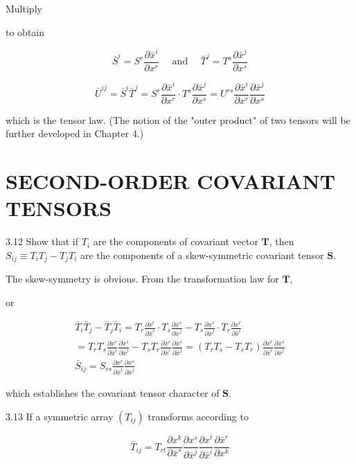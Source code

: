\documentclass[10pt]{article}
\begin{document}
Multiply

to obtain

$$
\bar{S}^{i}=S^{r} \frac{\partial \bar{x}^{i}}{\partial x^{r}} \quad \text { and } \quad \bar{T}^{j}=T^{s} \frac{\partial \bar{x}^{j}}{\partial x^{s}}
$$

$$
\bar{U}^{i j}=\bar{S}^{i} \bar{T}^{j}=S^{r} \frac{\partial \bar{x}^{i}}{\partial x^{r}} \cdot T^{s} \frac{\partial \bar{x}^{j}}{\partial x^{s}}=U^{r s} \frac{\partial \bar{x}^{i}}{\partial x^{r}} \frac{\partial \bar{x}^{j}}{\partial x^{s}}
$$

which is the tensor law. (The notion of the "outer product" of two tensors will be further developed in Chapter 4.)

\section*{SECOND-ORDER COVARIANT TENSORS}
3.12 Show that if $T_{i}$ are the components of covariant vector $\mathbf{T}$, then $S_{i j} \equiv T_{i} T_{j}-T_{j} T_{i}$ are the components of a skew-symmetric covariant tensor $\mathbf{S}$.

The skew-symmetry is obvious. From the transformation law for $\mathbf{T}$,

or

$$
\begin{gathered}
\bar{T}_{i} \bar{T}_{j}-\bar{T}_{j} \bar{T}_{i}=T_{r} \frac{\partial x^{r}}{\partial \bar{x}^{i}} \cdot T_{s} \frac{\partial x^{s}}{\partial \bar{x}^{j}}-T_{s} \frac{\partial x^{s}}{\partial \bar{x}^{j}} \cdot T_{r} \frac{\partial x^{r}}{\partial \bar{x}^{i}} \\
=T_{r} T_{s} \frac{\partial x^{r}}{\partial \bar{x}^{i}} \frac{\partial x^{s}}{\partial \bar{x}^{j}}-T_{s} T_{r} \frac{\partial x^{r}}{\partial \bar{x}^{i}} \frac{\partial x^{s}}{\partial \bar{x}^{j}}=\left(T_{r} T_{s}-T_{s} T_{r}\right) \frac{\partial x^{r}}{\partial \bar{x}^{i}} \frac{\partial x^{s}}{\partial \bar{x}^{j}} \\
\bar{S}_{i j}=S_{r s} \frac{\partial x^{r}}{\partial \bar{x}^{i}} \frac{\partial x^{s}}{\partial \bar{x}^{j}}
\end{gathered}
$$

which establishes the covariant tensor character of $\mathbf{S}$.

3.13 If a symmetric array $\left(T_{i j}\right)$ transforms according to

$$
\bar{T}_{i j}=T_{r t} \frac{\partial x^{k}}{\partial \bar{x}^{s}} \frac{\partial x^{s}}{\partial \bar{x}^{j}} \frac{\partial x^{t}}{\partial \bar{x}^{i}} \frac{\partial \bar{x}^{r}}{\partial x^{k}}
$$
\end{document}
